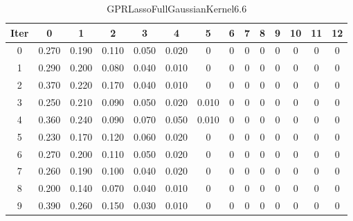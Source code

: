 \begin{table}
	\begin{center}
		\begin{tabular}{|c|c|c|c|c|c|c|c|c|c|c|c|c|c|}
			\hline
			Iter & 0 & 1 & 2 & 3 & 4 & 5 & 6 & 7 & 8 & 9 & 10 & 11 & 12 \\
			\hline
			0 & 0.270 & 0.190 & 0.110 & 0.050 & 0.020 & 0 & 0 & 0 & 0 & 0 & 0 & 0 & 0 \\
			\hline
			1 & 0.290 & 0.200 & 0.080 & 0.040 & 0.010 & 0 & 0 & 0 & 0 & 0 & 0 & 0 & 0 \\
			\hline
			2 & 0.370 & 0.220 & 0.170 & 0.040 & 0.010 & 0 & 0 & 0 & 0 & 0 & 0 & 0 & 0 \\
			\hline
			3 & 0.250 & 0.210 & 0.090 & 0.050 & 0.020 & 0.010 & 0 & 0 & 0 & 0 & 0 & 0 & 0 \\
			\hline
			4 & 0.360 & 0.240 & 0.090 & 0.070 & 0.050 & 0.010 & 0 & 0 & 0 & 0 & 0 & 0 & 0 \\
			\hline
			5 & 0.230 & 0.170 & 0.120 & 0.060 & 0.020 & 0 & 0 & 0 & 0 & 0 & 0 & 0 & 0 \\
			\hline
			6 & 0.270 & 0.200 & 0.110 & 0.050 & 0.020 & 0 & 0 & 0 & 0 & 0 & 0 & 0 & 0 \\
			\hline
			7 & 0.260 & 0.190 & 0.100 & 0.040 & 0.020 & 0 & 0 & 0 & 0 & 0 & 0 & 0 & 0 \\
			\hline
			8 & 0.200 & 0.140 & 0.070 & 0.040 & 0.010 & 0 & 0 & 0 & 0 & 0 & 0 & 0 & 0 \\
			\hline
			9 & 0.390 & 0.260 & 0.150 & 0.030 & 0.010 & 0 & 0 & 0 & 0 & 0 & 0 & 0 & 0 \\
			\hline
		\end{tabular}
	\end{center}
	\caption{GPRLassoFullGaussianKernel6.6}
\end{table}